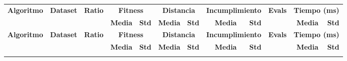 \begingroup
\fontsize{9}{12}\selectfont
\setlength{\tabcolsep}{3pt}
\begin{longtable}{llcrrrrrrrrr}
    \toprule
    \multirow{2}{*}{\textbf{Algoritmo}} & \multirow{2}{*}{\textbf{Dataset}} & \multirow{2}{*}{\textbf{Ratio}} & \multicolumn{2}{c}{\textbf{Fitness}} & \multicolumn{2}{c}{\textbf{Distancia}} & \multicolumn{2}{c}{\textbf{Incumplimiento}} & \multirow{2}{*}{\textbf{Evals}} & \multicolumn{2}{c}{\textbf{Tiempo (ms)}} \\
    \cmidrule(lr){4-5} \cmidrule(lr){6-7} \cmidrule(lr){8-9} \cmidrule(lr){11-12}
    & & & \textbf{Media} & \textbf{Std} & \textbf{Media} & \textbf{Std} & \textbf{Media} & \textbf{Std} & & \textbf{Media} & \textbf{Std} \\
    \midrule
    \endfirsthead

    \toprule
    \multirow{2}{*}{\textbf{Algoritmo}} & \multirow{2}{*}{\textbf{Dataset}} & \multirow{2}{*}{\textbf{Ratio}} & \multicolumn{2}{c}{\textbf{Fitness}} & \multicolumn{2}{c}{\textbf{Distancia}} & \multicolumn{2}{c}{\textbf{Incumplimiento}} & \multirow{2}{*}{\textbf{Evals}} & \multicolumn{2}{c}{\textbf{Tiempo (ms)}} \\
    \cmidrule(lr){4-5} \cmidrule(lr){6-7} \cmidrule(lr){8-9} \cmidrule(lr){11-12}
    & & & \textbf{Media} & \textbf{Std} & \textbf{Media} & \textbf{Std} & \textbf{Media} & \textbf{Std} & & \textbf{Media} & \textbf{Std} \\
    \midrule
    \endhead

    \midrule
    \endfoot


\end{longtable}
